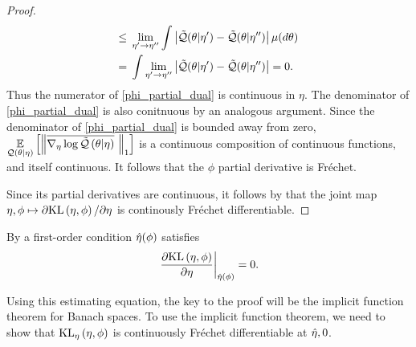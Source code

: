 \begin{lem}
\begin{proof}
\begin{align*}
\le{}&
\lim_{\eta' \rightarrow \eta''}
\int  \abs{\qtil(\theta \vert \eta') - \qtil(\theta \vert \eta'')}
\mu(d\theta)
\\={}&
\int \lim_{\eta' \rightarrow \eta''}  \abs{
\qtil(\theta \vert \eta') - \qtil(\theta \vert \eta'')
}
={} 0.
%
\end{align*}
%
Thus the numerator of \eqref{phi_partial_dual} is continuous in $\eta$. The
denominator of \eqref{phi_partial_dual} is also conitnuous by an analogous
argument.  Since the denominator of \eqref{phi_partial_dual} is bounded away
from zero, $\underset{\mathcal{Q}(\theta \vert \eta)}{\mathbb{E}}\left[\left\Vert\overline{{\nabla_\eta \log \tilde{\mathcal{Q}}}\left(\theta \vert
\eta\right)}\,\,\right\Vert_1\right]$ is a continuous composition of continuous functions, and itself
continuous.  It follows that the $\phi$ partial derivative is Fr{\'e}chet.

Since its partial derivatives are continuous, it follows by \citet[Proposition
4.14(c)]{zeidler:2013:functional} that the joint map $\eta, \phi \mapsto
\partial \mathrm{KL}\left(\eta, \phi\right) / \partial \eta$ is continously Fr{\'e}chet
differentiable.

%
\end{proof}
%
\end{lem}



%


By a first-order
condition $\hat\eta(\phi)$ satisfies
%
\begin{align*}
%
\fracat{\partial \KL{\eta, \phi}}
                {\partial \eta}
                {\etaopt(\phi)} = 0.
%
\end{align*}


Using this estimating equation, the key to the proof will be the implicit
function theorem for Banach spaces.  To use the implicit function theorem, we
need to show that $\mathrm{KL}_{\eta}\left(\eta, \phi\right)$ is continuously Fr{\'e}chet
differentiable at $\hat\eta, 0$.


